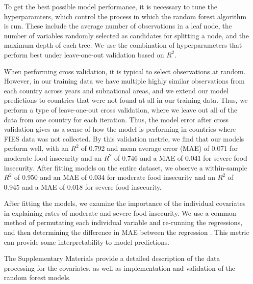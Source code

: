 \documentclass{article}
\begin{document}
To get the best possible model performance, it is necessary to tune the hyperparamters, which control the process in which the random forest algorithm is run.  These include the average number of observations in a leaf node, the number of variables randomly selected as candidates for splitting a node, and the maximum depth of each tree.  We use the combination of hyperparameters that perform best under leave-one-out validation based on $R^2$.

When performing cross validation, it is typical to select observations at random.  However, in our training data we have multiple highly similar observations from each country across years and subnational areas, and we extend our model predictions to countries that were not found at all in our training data.  Thus, we perform a type of leave-one-out cross validation, where we leave out all of the data from one country for each iteration.  Thus, the model error after cross validation gives us a sense of how the model is performing in countries where FIES data was not collected.  By this validation metric, we find that our models perform well, with an $R^2$ of 0.792 and mean average error (MAE) of 0.071 for moderate food insecurity and an $R^2$ of 0.746 and a MAE of 0.041 for severe food insecurity.  After fitting models on the entire dataset, we observe a within-sample $R^2$ of 0.950 and an MAE of 0.034 for moderate food insecurity and an $R^2$ of 0.945 and a MAE of 0.018 for severe food insecurity.

After fitting the models, we examine the importance of the individual covariates in explaining rates of moderate and severe food insecurity. We use a common method of permutating each individual variable and re-running the regressions, and then determining the difference in MAE between the regression \citep{ishwaran2007variable, breiman2001random}.  This metric can provide some interpretability to model predictions.

The Supplementary Materials provide a detailed description of the data processing for the covariates, as well as implementation and validation of the random forest models.

\printbibliography
\end{document}
